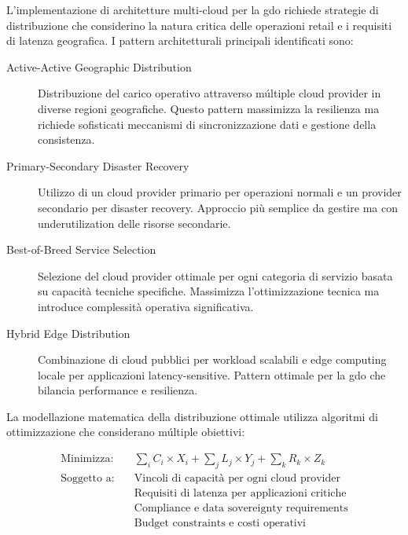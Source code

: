 L'implementazione di architetture multi-cloud per la \gls{gdo} richiede strategie di distribuzione che considerino la natura critica delle operazioni retail e i requisiti di latenza geografica. I pattern architetturali principali identificati sono:

\begin{description}
    \item[Active-Active Geographic Distribution] Distribuzione del carico operativo attraverso múltiple cloud provider in diverse regioni geografiche. Questo pattern massimizza la resilienza ma richiede sofisticati meccanismi di sincronizzazione dati e gestione della consistenza.
    
    \item[Primary-Secondary Disaster Recovery] Utilizzo di un cloud provider primario per operazioni normali e un provider secondario per disaster recovery. Approccio più semplice da gestire ma con underutilization delle risorse secondarie.
    
    \item[Best-of-Breed Service Selection] Selezione del cloud provider ottimale per ogni categoria di servizio basata su capacità tecniche specifiche. Massimizza l'ottimizzazione tecnica ma introduce complessità operativa significativa.
    
    \item[Hybrid Edge Distribution] Combinazione di cloud pubblici per workload scalabili e edge computing locale per applicazioni latency-sensitive. Pattern ottimale per la \gls{gdo} che bilancia performance e resilienza.
\end{description}

La modellazione matematica della distribuzione ottimale utilizza algoritmi di ottimizzazione che considerano múltiple obiettivi:

\begin{align}
\text{Minimizza:} \quad & \sum_{i} C_i \times X_i + \sum_{j} L_j \times Y_j + \sum_{k} R_k \times Z_k \label{eq:multi-cloud-optimization} \\
\text{Soggetto a:} \quad & \text{Vincoli di capacità per ogni cloud provider} \nonumber \\
& \text{Requisiti di latenza per applicazioni critiche} \nonumber \\
& \text{Compliance e data sovereignty requirements} \nonumber \\
& \text{Budget constraints e costi operativi} \nonumber
\end{align}

